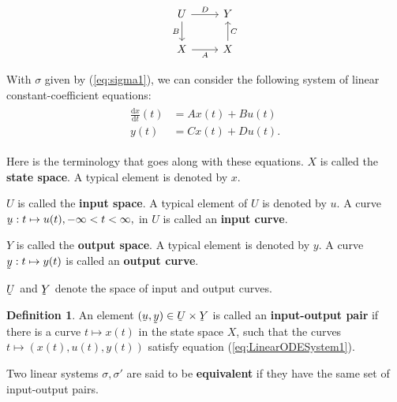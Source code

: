\documentclass[12pt]{book}
\theoremstyle{plain}
\theoremstyle{definition}
\newtheorem{definition}{Definition}[section]
\newcommand{\dd}[1]{\mathrm{d}#1}
\newcommand{\utilde}[1]{\underaccent{\tilde}{#1}}
\begin{document}
\begin{equation*}
\begin{tikzcd}
    U \ar[r,"D"] \ar[d,"B"'] & Y \\
    X \ar[r,"A"'] & X \ar[u,"C"']
\end{tikzcd}
\end{equation*}

With $\sigma$ given by (\ref{eq:sigma1}), we can consider the following system of linear constant-coefficient equations:
\begin{align}
\begin{split} \label{eq:LinearODESystem1}
    \frac{\dd{x}}{\dd{t}}(t) &= Ax(t) + Bu(t) \\
    y(t) &= Cx(t) + Du(t).
\end{split}
\end{align}

Here is the terminology that goes along with these equations.
$X$ is called the \textbf{state space}.
A typical element is denoted by $x$.

$U$ is called the \textbf{input space}.
A typical element of $U$ is denoted by $u$.
A curve $\utilde{u}: t \mapsto u(t), -\infty < t < \infty,$ in $U$ is called an \textbf{input curve}.

$Y$ is called the \textbf{output space}.
A typical element is denoted by $y$.
A curve $\utilde{y}: t \mapsto y(t)$ is called an \textbf{output curve}.

$\utilde{U}$ and $\utilde{Y}$ denote the space of input and output curves.

\begin{definition}
    An element $(\utilde{u}, \utilde{y}) \in \utilde{U} \times \utilde{Y}$ is called an \textbf{input-output pair} if there is a curve $t \mapsto x(t)$ in the state space $X$, such that the curves $t \mapsto (x(t), u(t), y(t))$ satisfy equation (\ref{eq:LinearODESystem1}).
\end{definition}

Two linear systems $\sigma, \sigma'$ are said to be \textbf{equivalent} if they have the same set of input-output pairs.
\end{document}

